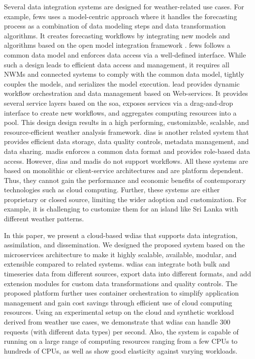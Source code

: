 \documentclass[conference]{IEEEtran}
\begin{document}
Several data integration systems are designed for weather-related use cases. For example, \acrshort{fews} \cite{Werner2013TheSystem} uses a model-centric approach where it handles the forecasting process as a combination of data modeling steps and data transformation algorithms. It creates forecasting workflows by integrating new models and algorithms based on the open model integration framework \cite{Kokkonen2003InterfacingXML}. \acrshort{fews} follows a common data model and enforces data access via a well-defined interface. While such a design leads to efficient data access and management, it requires all NWMs and connected systems to comply with the common data model, tightly couples the models, and serializes the model execution. 
\acrfull{lead} \cite{Droegemeier2005Service-OrientedWeather} provides dynamic workflow orchestration and data management based on Web-services. It provides several service layers based on the \acrfull{soa}, exposes services via a drag-and-drop interface to create new workflows, and aggregates computing resources into a pool. This design design results in a high performing, customizable, scalable, and resource-efficient weather analysis framework. 
\acrfull{dias} \cite{Kawasaki2018DataReduction} is another related system that provides efficient data storage, data quality controls, metadata management, and data sharing. \acrfull{madis} \cite{Macdermaid2005ArchitectureP2.39} enforces a common data format and provides role-based data access. 
However, \acrshort{dias} and \acrshort{madis} do not support workflows. All these systems are based on monolithic or client-service architectures and are platform dependent. Thus, they cannot gain the performance and economic benefits of contemporary technologies such as cloud computing. Further, these systems are either proprietary or closed source, limiting the wider adoption and customization. For example, it is challenging to customize them for an island like Sri Lanka with different weather patterns.

In this paper, we present a cloud-based \acrfull{wdias} that supports data integration, assimilation, and dissemination. We designed the proposed system based on the microservices architecture to make it highly scalable, available, modular, and extensible compared to related systems. \acrshort{wdias} can integrate both bulk and timeseries data from different sources, export data into different formats, and add extension modules for custom data transformations and quality controls. The proposed platform further uses container orchestration to simplify application management and gain cost savings through efficient use of cloud computing resources. 
Using an experimental setup on the cloud and synthetic workload derived from weather use cases, we demonstrate that \acrshort{wdias} can handle 300 requests (with different data types) per second. Also, the system is capable of running on a large range of computing resources ranging from a few CPUs to hundreds of CPUs, as well as show good elasticity against varying workloads.
\end{document}
